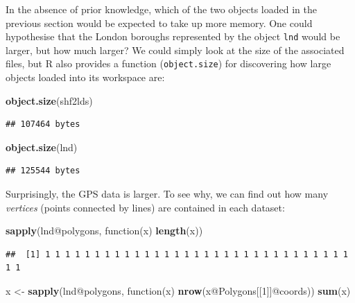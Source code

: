 \documentclass[]{article}
\newenvironment{Shaded}{}{}
\newcommand{\KeywordTok}[1]{\textcolor[rgb]{0.00,0.44,0.13}{\textbf{{#1}}}}
\newcommand{\DecValTok}[1]{\textcolor[rgb]{0.25,0.63,0.44}{{#1}}}
\newcommand{\StringTok}[1]{\textcolor[rgb]{0.25,0.44,0.63}{{#1}}}
\newcommand{\NormalTok}[1]{{#1}}
\begin{document}
In the absence of prior knowledge, which of the two objects loaded in
the previous section would be expected to take up more memory. One could
hypothesise that the London boroughs represented by the object
\texttt{lnd} would be larger, but how much larger? We could simply look
at the size of the associated files, but R also provides a function
(\texttt{object.size}) for discovering how large objects loaded into its
workspace are:

\begin{Shaded}
\begin{Highlighting}[]
\KeywordTok{object.size}\NormalTok{(shf2lds)}
\end{Highlighting}
\end{Shaded}

\begin{verbatim}
## 107464 bytes
\end{verbatim}

\begin{Shaded}
\begin{Highlighting}[]
\KeywordTok{object.size}\NormalTok{(lnd)}
\end{Highlighting}
\end{Shaded}

\begin{verbatim}
## 125544 bytes
\end{verbatim}

Surprisingly, the GPS data is larger. To see why, we can find out how
many \emph{vertices} (points connected by lines) are contained in each
dataset:

\begin{Shaded}
\begin{Highlighting}[]
\KeywordTok{sapply}\NormalTok{(lnd@polygons, function(x) }\KeywordTok{length}\NormalTok{(x))}
\end{Highlighting}
\end{Shaded}

\begin{verbatim}
##  [1] 1 1 1 1 1 1 1 1 1 1 1 1 1 1 1 1 1 1 1 1 1 1 1 1 1 1 1 1 1 1 1 1 1
\end{verbatim}

\begin{Shaded}
\begin{Highlighting}[]
\NormalTok{x <-}\StringTok{ }\KeywordTok{sapply}\NormalTok{(lnd@polygons, function(x) }\KeywordTok{nrow}\NormalTok{(x@Polygons[[}\DecValTok{1}\NormalTok{]]@coords))}
\KeywordTok{sum}\NormalTok{(x)}
\end{Highlighting}
\end{Shaded}
\end{document}

